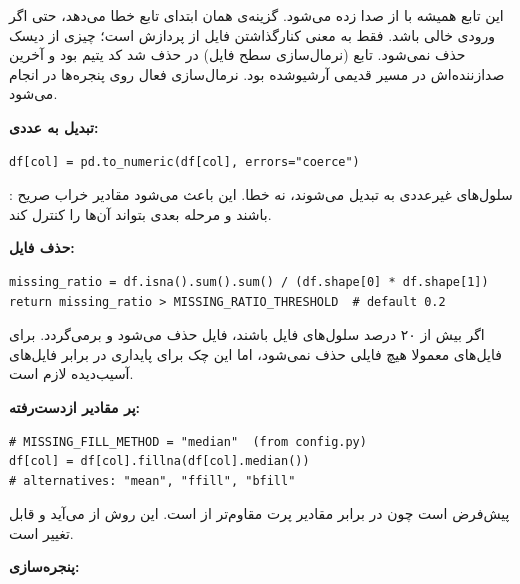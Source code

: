 \documentclass{article}
\newcommand{\pmdash}{\lr{---}}
\newcommand{\mysubsection}[1]{
\par\vspace{0.5cm}
\noindent\textcolor{main_blue}{\large\textbf{#1}}
\par\vspace{0.2cm}
}
\begin{document}
این تابع همیشه با  از  صدا زده می‌شود.
گزینه‌ی  همان ابتدای تابع خطا می‌دهد، حتی اگر ورودی خالی باشد.
 فقط به معنی کنارگذاشتن فایل از پردازش است؛ چیزی از دیسک حذف نمی‌شود.
تابع  (نرمال‌سازی سطح فایل) در  حذف شد \pmdash{}
کد یتیم بود و آخرین صدازننده‌اش در مسیر قدیمی آرشیوشده بود.
نرمال‌سازی فعال روی پنجره‌ها در  انجام می‌شود.

\mysubsection{تبدیل به عددی: \lr{convert\_dataframe\_to\_numeric}}

\begin{latin}
\begin{lstlisting}
df[col] = pd.to_numeric(df[col], errors="coerce")
\end{lstlisting}
\end{latin}

: سلول‌های غیرعددی به  تبدیل می‌شوند، نه خطا.
این باعث می‌شود مقادیر خراب صریح باشند و مرحله بعدی بتواند آن‌ها را کنترل کند.

\mysubsection{حذف فایل: }

\begin{latin}
\begin{lstlisting}
missing_ratio = df.isna().sum().sum() / (df.shape[0] * df.shape[1])
return missing_ratio > MISSING_RATIO_THRESHOLD  # default 0.2
\end{lstlisting}
\end{latin}

اگر بیش از ۲۰ درصد سلول‌های فایل  باشند، فایل حذف می‌شود و  برمی‌گردد.
برای فایل‌های  معمولا هیچ فایلی حذف نمی‌شود،
اما این چک برای پایداری در برابر فایل‌های آسیب‌دیده لازم است.

\mysubsection{پر مقادیر ازدست‌رفته: }

\begin{latin}
\begin{lstlisting}
# MISSING_FILL_METHOD = "median"  (from config.py)
df[col] = df[col].fillna(df[col].median())
# alternatives: "mean", "ffill", "bfill"
\end{lstlisting}
\end{latin}

پیش‌فرض  است چون در برابر مقادیر پرت مقاوم‌تر از  است.
این روش از  می‌آید و قابل تغییر است.

\mysubsection{پنجره‌سازی: }
\end{document}
